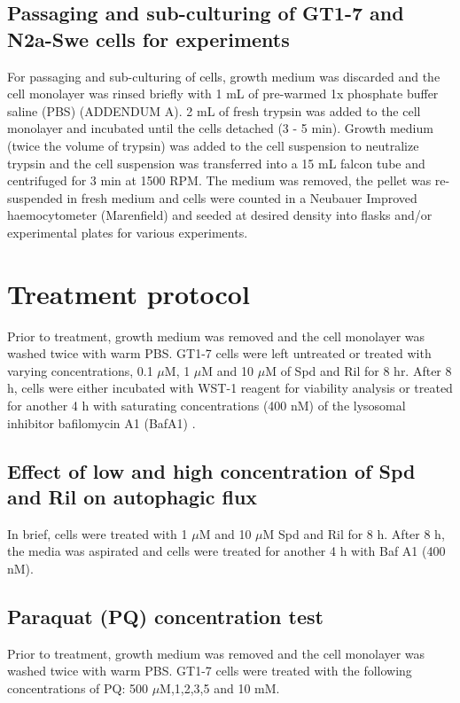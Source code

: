 \subsection{Passaging and sub-culturing of GT1-7 and N2a-Swe cells for experiments}
For passaging and sub-culturing of cells, growth medium was discarded and the cell monolayer was rinsed briefly with 1 mL of pre-warmed 1x phosphate buffer saline (PBS) (ADDENDUM A). 2 mL of fresh trypsin was added to the cell monolayer and incubated until the cells detached (3 - 5 min). Growth medium (twice the volume of trypsin) was added to the cell suspension to neutralize trypsin and the cell suspension was transferred into a 15 mL falcon tube and centrifuged for 3 min at 1500 RPM. The medium was removed, the pellet was re-suspended in fresh medium and cells were counted in a Neubauer Improved haemocytometer (Marenfield) and seeded at desired density into flasks and/or experimental plates for various experiments.

\section{Treatment protocol}
Prior to treatment, growth medium was removed and the cell monolayer was washed twice with warm PBS. GT1-7 cells were left untreated or treated with varying concentrations, 0.1 $\mu$M, 1 $\mu$M and 10 $\mu$M of Spd and Ril for 8 hr. After 8 h, cells were either incubated with WST-1 reagent for viability analysis or treated for another 4 h with saturating concentrations (400 nM) of the lysosomal inhibitor bafilomycin A1 (BafA1) \citep{DuToit2018b,loos2014}.

\subsection{Effect of low and high concentration of Spd and Ril on autophagic flux}
In brief, cells were treated with 1 $\mu$M and 10 $\mu$M Spd and Ril for 8 h. After 8 h, the media was aspirated and cells were treated for another 4 h with Baf A1 (400 nM).

\subsection{Paraquat (PQ) concentration test}
Prior to treatment, growth medium was removed and the cell monolayer was washed twice with warm PBS. GT1-7 cells were treated with the following concentrations of PQ: 500 $\mu$M,1,2,3,5 and 10 mM. 

